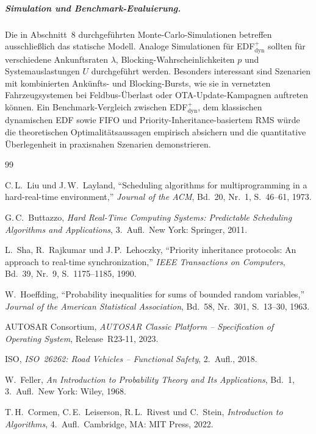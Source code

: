 ﻿\documentclass[a4paper,12pt]{article}
\theoremstyle{definition}
\begin{document}
	\subparagraph{Simulation und Benchmark-Evaluierung.}
	Die in Abschnitt~8 durchgeführten Monte-Carlo-Simulationen betreffen ausschlie\ss{}lich
	das statische Modell. Analoge Simulationen für EDF$^+_{\mathrm{dyn}}$ sollten
	für verschiedene Ankunftsraten $\lambda$, Blocking-Wahrscheinlichkeiten $p$ und
	Systemauslastungen $U$ durchgeführt werden. Besonders interessant sind
	Szenarien mit kombinierten Ankünfts- und Blocking-Bursts, wie sie in
	vernetzten Fahrzeugsystemen bei Feldbus-Überlast oder OTA-Update-Kampagnen
	auftreten können. Ein Benchmark-Vergleich zwischen EDF$^+_{\mathrm{dyn}}$,
	dem klassischen dynamischen EDF sowie FIFO und Priority-Inheritance-basiertem
	RMS würde die theoretischen Optimalitätsaussagen empirisch absichern und
	die quantitative Überlegenheit in praxisnahen Szenarien demonstrieren.

	\begin{thebibliography}{99}
		
		C.\,L.\ Liu und J.\,W.\ Layland,
		``Scheduling algorithms for multiprogramming in a hard-real-time environment,''
		\textit{Journal of the ACM}, Bd.~20, Nr.~1, S.~46--61, 1973.
		
		G.\,C.\ Buttazzo,
		\textit{Hard Real-Time Computing Systems: Predictable Scheduling Algorithms and Applications},
		3.~Aufl.\ New York: Springer, 2011.
		
		L.\ Sha, R.\ Rajkumar und J.\,P.\ Lehoczky,
		``Priority inheritance protocols: An approach to real-time synchronization,''
		\textit{IEEE Transactions on Computers}, Bd.~39, Nr.~9, S.~1175--1185, 1990.
		
		W.\ Hoeffding,
		``Probability inequalities for sums of bounded random variables,''
		\textit{Journal of the American Statistical Association}, Bd.~58, Nr.~301, S.~13--30, 1963.
		
		AUTOSAR Consortium,
		\textit{AUTOSAR Classic Platform -- Specification of Operating System},
		Release~R23-11, 2023.
		
		ISO,
		\textit{ISO~26262: Road Vehicles -- Functional Safety},
		2.~Aufl., 2018.
		
		W.\ Feller,
		\textit{An Introduction to Probability Theory and Its Applications},
		Bd.~1, 3.~Aufl.\ New York: Wiley, 1968.
		
		T.\,H.\ Cormen, C.\,E.\ Leiserson, R.\,L.\ Rivest und C.\ Stein,
		\textit{Introduction to Algorithms},
		4.~Aufl.\ Cambridge, MA: MIT Press, 2022.


\end{thebibliography}
\end{document}
